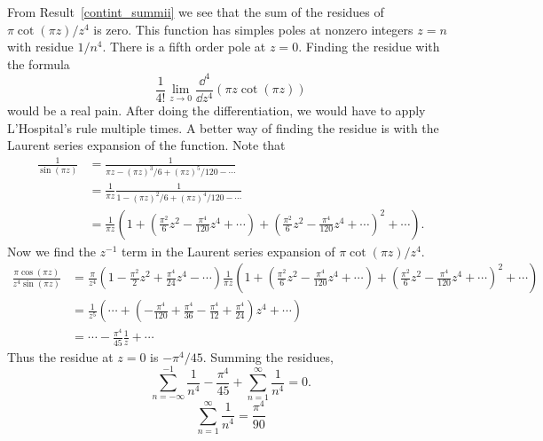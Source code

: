 {%
\begin{Solution}
  \label{solution sum 1/n^4}
  From Result~\ref{contint_summii} we see that the sum of the residues of
  $\pi \cot (\pi z) / z^4$ is zero.  This function has simples poles at 
  nonzero integers $z = n$ with residue $1/n^4$.  There is a fifth order
  pole at $z = 0$.  Finding the residue with the formula
  \[
  \frac{1}{4!} \lim_{z \to 0} \frac{\dd^4}{\dd z^4} (\pi z \cot(\pi z))
  \]
  would be a real pain.  After doing the differentiation, we would have to
  apply L'Hospital's rule multiple times.  A better way of finding the 
  residue is with the Laurent series expansion of the function.
  Note that
  \begin{align*}
    \frac{1}{\sin(\pi z)}
    &= \frac{1}{\pi z - (\pi z)^3 / 6 + (\pi z)^5 / 120 - \cdots } \\
    &= \frac{1}{\pi z} \frac{1}
    { 1 - (\pi z)^2 / 6 + (\pi z)^4 / 120 - \cdots } \\
    &= \frac{1}{\pi z} \left( 1 + 
      \left( \frac{\pi^2}{6} z^2 - \frac{\pi^4}{120} z^4 + \cdots \right)
      +\left( \frac{\pi^2}{6} z^2 - \frac{\pi^4}{120} z^4 + \cdots \right)^2
      + \cdots \right).
  \end{align*}
  Now we find the $z^{-1}$ term in the Laurent series expansion of
  $\pi \cot(\pi z) / z^4$.
  \begin{align*}
    \frac{ \pi \cos(\pi z) }{ z^4 \sin(\pi z) }
    &= \frac{\pi}{z^4} 
    \left( 1 - \frac{\pi^2}{2} z^2 + \frac{\pi^4}{24} z^4 - \cdots \right)
    \frac{1}{\pi z} \left( 1 + 
      \left( \frac{\pi^2}{6} z^2 - \frac{\pi^4}{120} z^4 + \cdots \right)
      +\left( \frac{\pi^2}{6} z^2 - \frac{\pi^4}{120} z^4 + \cdots \right)^2
      + \cdots \right) \\
    &= \frac{1}{z^5} \left( \cdots + \left( - \frac{\pi^4}{120}
        + \frac{\pi^4}{36} - \frac{\pi^4}{12} + \frac{\pi^4}{24}
      \right) z^4 + \cdots \right) \\
    &= \cdots - \frac{\pi^4}{45} \frac{1}{z} + \cdots
  \end{align*}
  Thus the residue at $z = 0$ is $- \pi^4 / 45$.  Summing the residues,
  \[
  \sum_{n = - \infty}^{-1} \frac{1}{n^4} - \frac{\pi^4}{45}
  + \sum_{n=1}^\infty \frac{1}{n^4} = 0.
  \]
  \[
  \boxed{
    \sum_{n=1}^\infty \frac{1}{n^4} = \frac{\pi^4}{90}
    }
  \]
\end{Solution}















}
